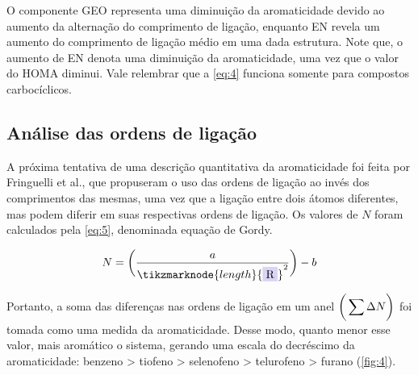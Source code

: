 O componente GEO representa uma diminuição da aromaticidade devido ao aumento da alternação do comprimento de ligação, enquanto EN revela um aumento do comprimento de ligação médio em uma dada estrutura. Note que, o aumento de EN denota uma diminuição da aromaticidade, uma vez que o valor do HOMA diminui. Vale relembrar que a \autoref{eq:4} funciona somente para compostos carbocíclicos.

\subsection{Análise das ordens de ligação}

A próxima tentativa de uma descrição quantitativa da aromaticidade foi feita por Fringuelli et al.\autocite{Fringuelli1974}, que propuseram o uso das ordens de ligação ao invés dos comprimentos das mesmas, uma vez que a ligação entre dois átomos diferentes, mas podem diferir em suas respectivas ordens de ligação. Os valores de $N$ foram calculados pela \autoref{eq:5}, denominada equação de Gordy\autocite{Gordy1947}.

\begin{figure}[htb]
\begin{equation}
    \label{eq:5}
    N = \bigg{(} \frac{a}{\tikzmarknode{length}{\highlight{blue}{R}}^2} \bigg{)} - b
\end{equation}
\vspace{2\baselineskip}
\end{figure}

Portanto, a soma das diferenças nas ordens de ligação em um anel $\bigg{(} \displaystyle \sum \Delta N \bigg{)}$ foi tomada como uma medida da aromaticidade. Desse modo, quanto menor esse valor, mais aromático o sistema, gerando uma escala do decréscimo da aromaticidade: benzeno > tiofeno > selenofeno > telurofeno > furano \autocite{Fringuelli1974} (\autoref{fig:4}). 

